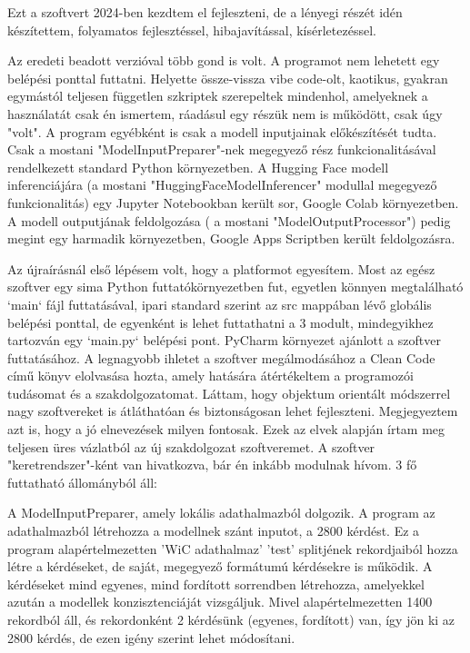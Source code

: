 \usepackage{graphicx}\begin{Document}
                         Ezt a szoftvert 2024-ben kezdtem el fejleszteni, de a lényegi részét idén készítettem, folyamatos fejlesztéssel, hibajavítással, kísérletezéssel.


                         Az eredeti beadott verzióval több gond is volt. A programot nem lehetett egy belépési ponttal futtatni. Helyette össze-vissza vibe code-olt, kaotikus, gyakran egymástól teljesen független szkriptek szerepeltek mindenhol, amelyeknek a használatát csak én ismertem, ráadásul egy részük nem is működött, csak úgy "volt". A program egyébként is csak a modell inputjainak előkészítését tudta. Csak a mostani "ModelInputPreparer"-nek megegyező rész funkcionalitásával rendelkezett standard Python környezetben. A Hugging Face modell inferenciájára (a mostani "HuggingFaceModelInferencer" modullal megegyező funkcionalitás) egy Jupyter Notebookban került sor, Google Colab környezetben. A modell outputjának feldolgozása ( a mostani "ModelOutputProcessor") pedig megint egy harmadik környezetben, Google Apps Scriptben került feldolgozásra.

                         Az újraírásnál első lépésem volt, hogy a platformot egyesítem. Most az egész szoftver egy sima Python futtatókörnyezetben fut, egyetlen könnyen megtalálható `main` fájl futtatásával, ipari standard szerint az src mappában lévő globális belépési ponttal, de egyenként is lehet futtathatni a 3 modult, mindegyikhez tartozván egy `main.py` belépési pont. PyCharm környezet ajánlott a szoftver futtatásához. A legnagyobb ihletet a szoftver megálmodásához a Clean Code című könyv elolvasása hozta, amely hatására átértékeltem a programozói tudásomat és a szakdolgozatomat. Láttam, hogy objektum orientált módszerrel nagy szoftvereket is átláthatóan és biztonságosan lehet fejleszteni. Megjegyeztem azt is, hogy a jó elnevezések milyen fontosak. Ezek az elvek alapján írtam meg teljesen üres vázlatból az új szakdolgozat szoftveremet. A szoftver "keretrendszer"-ként van hivatkozva, bár én inkább modulnak hívom. 3 fő futtatható állományból áll:

                         A ModelInputPreparer, amely lokális adathalmazból dolgozik. A program az adathalmazból létrehozza a modellnek szánt inputot, a 2800 kérdést. Ez a program alapértelmezetten 'WiC adathalmaz' 'test' splitjének rekordjaiból hozza létre a kérdéseket, de saját, megegyező formátumú kérdésekre is működik. A kérdéseket mind egyenes, mind fordított sorrendben létrehozza, amelyekkel azután a modellek konzisztenciáját vizsgáljuk. Mivel alapértelmezetten 1400 rekordból áll, és rekordonként 2 kérdésünk (egyenes, fordított) van, így jön ki az 2800 kérdés, de ezen igény szerint lehet módosítani.


\end{Document}
